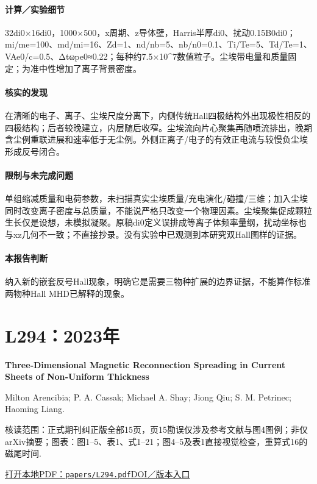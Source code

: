 \documentclass[UTF8,a4paper,11pt,openany,fontset=fandol]{ctexbook}
\begin{document}
\paragraph{计算／实验细节}32di0×16di0，1000×500，x周期、z导体壁，Harris半厚di0、扰动0.15B0di0；mi/me=100、md/mi=16、Zd=1、nd/nb=5、nb/n0=0.1、Ti/Te=5、Td/Te=1、VAe0/c=0.5、Δtωpe0≈0.22；每种约7.5×10\textasciicircum{}7数值粒子。尘埃带电量和质量固定；为准中性增加了离子背景密度。

\paragraph{核实的发现}在清晰的电子、离子、尘埃尺度分离下，内侧传统Hall四极结构外出现极性相反的四极结构；后者较晚建立，内层随后收窄。尘埃流向片心聚集再随喷流排出，晚期含尘例重联进展和速率低于无尘例。外侧正离子/电子的有效正电流与较慢负尘埃形成反号闭合。

\paragraph{限制与未完成问题}单组缩减质量和电荷参数，未扫描真实尘埃质量/充电演化/碰撞/三维；加入尘埃同时改变离子密度与总质量，不能说严格只改变一个物理因素。尘埃聚集促成颗粒生长仅是设想，未模拟凝聚。原稿di0定义误排成等离子体频率量纲，扰动坐标也与xz几何不一致；不直接抄录。没有实验中已观测到本研究双Hall图样的证据。

\paragraph{本报告判断}纳入新的嵌套反号Hall现象，明确它是需要三物种扩展的边界证据，不能算作标准两物种Hall MHD已解释的现象。

\section{L294：2023年}\label{paper:L294}

\textbf{Three‐Dimensional Magnetic Reconnection Spreading in Current Sheets of Non‐Uniform Thickness}\citep{L294}\

Milton Arencibia;  P. A. Cassak;  Michael A. Shay;  Jiong Qiu;  S. M. Petrinec;  Haoming Liang.

\textsf{核读范围：}正式期刊纠正版全部15页，页15勘误仅涉及参考文献与图4图例；非仅arXiv摘要；\textsf{图表：}图1–5、表1、式1–21；图4–5及表1直接视觉检查，重算式16的磁尾时间.

\href{run:../papers/L294.pdf}{打开本地PDF：\texttt{papers/L294.pdf}}\quad\href{https://doi.org/10.1029/2022ja030999}{DOI／版本入口}
\end{document}
